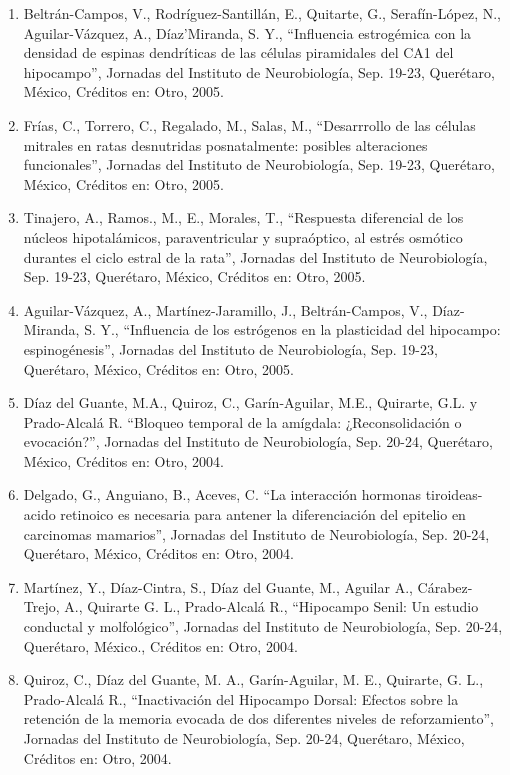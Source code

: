 \begin{enumerate}
\item  Beltrán-Campos, V., Rodríguez-Santillán, E., Quitarte, G., Serafín-López, N., Aguilar-Vázquez, A., Díaz’Miranda, S. 
Y., 
“Influencia estrogémica con la densidad de espinas dendríticas de las células piramidales del CA1 del hipocampo”, Jornadas 
del Instituto de Neurobiología, Sep. 19-23, Querétaro, México, Créditos en: Otro, 2005.

\item  Frías, C., Torrero, C., Regalado, M., Salas, M., “Desarrrollo de las células mitrales en ratas desnutridas 
posnatalmente: 
posibles alteraciones funcionales”, Jornadas del Instituto de Neurobiología, Sep. 19-23, Querétaro, México, Créditos en: 
Otro, 2005.

\item  Tinajero, A., Ramos., M., E., Morales, T., “Respuesta diferencial de los núcleos hipotalámicos, paraventricular y 
supraóptico, al estrés osmótico durantes el ciclo estral de la rata”, Jornadas del Instituto de Neurobiología, Sep. 19-23, 
Querétaro, México, Créditos en: Otro, 2005.

\item  Aguilar-Vázquez, A., Martínez-Jaramillo, J., Beltrán-Campos, V., Díaz-Miranda, S. Y., “Influencia de los estrógenos en 
la 
plasticidad del hipocampo: espinogénesis”, Jornadas del Instituto de Neurobiología, Sep. 19-23, Querétaro, México, Créditos 
en: Otro, 2005.

\item  Díaz del Guante, M.A., Quiroz, C., Garín-Aguilar, M.E., Quirarte, G.L. y Prado-Alcalá R. “Bloqueo temporal de la 
amígdala: ¿Reconsolidación o evocación?”, Jornadas del Instituto de Neurobiología, Sep. 20-24, Querétaro, México, Créditos 
en: Otro, 2004.

\item  Delgado, G., Anguiano, B., Aceves, C. “La interacción hormonas tiroideas-acido retinoico es necesaria para antener la 
diferenciación del epitelio en carcinomas mamarios”, Jornadas del Instituto de Neurobiología, Sep. 20-24, Querétaro, México, 
Créditos en: Otro, 2004.

\item  Martínez, Y., Díaz-Cintra, S., Díaz del Guante, M., Aguilar A., Cárabez-Trejo, A., Quirarte G. L., Prado-Alcalá R., 
“Hipocampo Senil: Un estudio conductal y molfológico”, Jornadas del Instituto de Neurobiología, Sep. 20-24, Querétaro, 
México., Créditos en: Otro, 2004.

\item Quiroz, C., Díaz del Guante, M. A., Garín-Aguilar, M. E., Quirarte, G. L., Prado-Alcalá R., “Inactivación del Hipocampo 
Dorsal: Efectos sobre la retención de la memoria evocada de dos diferentes niveles de reforzamiento”, Jornadas del Instituto 
de Neurobiología, Sep. 20-24, Querétaro, México, Créditos en: Otro, 2004.


\end{enumerate}

